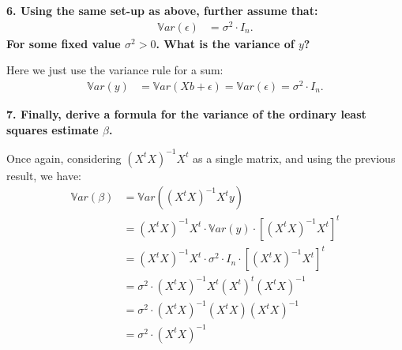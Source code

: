 \documentclass[12pt,hidelinks]{article}
\numberwithin{equation}{section}
\begin{document}
\vspace*{12pt}

\textbf{6. Using the same set-up as above, further assume that:}
\begin{align}
\mathbb{V}ar(\epsilon) &= \sigma^2 \cdot I_n.
\end{align}
\textbf{For some fixed value $\sigma^2 > 0$. What is the variance of $y$?}

\vspace*{12pt}

Here we just use the variance rule for a sum:
\begin{align}
\mathbb{V}ar(y) &= \mathbb{V}ar(Xb + \epsilon) = \mathbb{V}ar(\epsilon) = \sigma^2 \cdot I_n.
\end{align}

\vspace*{12pt}

\textbf{7. Finally, derive a formula for the variance of the ordinary least
squares estimate $\beta$.}

\vspace*{12pt}

Once again, considering $(X^tX)^{-1} X^t$ as a single matrix, and using the
previous result, we have:
\begin{align}
\mathbb{V}ar(\beta) &= \mathbb{V}ar((X^t X)^{-1} X^t y) \\
&= (X^t X)^{-1} X^t \cdot \mathbb{V}ar(y) \cdot \left[(X^t X)^{-1} X^t \right]^t \\
&= (X^t X)^{-1} X^t \cdot \sigma^2 \cdot I_n \cdot \left[(X^t X)^{-1} X^t \right]^t \\
&= \sigma^2 \cdot (X^t X)^{-1} X^t (X^t)^t (X^t X)^{-1} \\
&= \sigma^2 \cdot (X^t X)^{-1} (X^t X) (X^t X)^{-1} \\
&= \sigma^2 \cdot (X^t X)^{-1}
\end{align}
\end{document}
